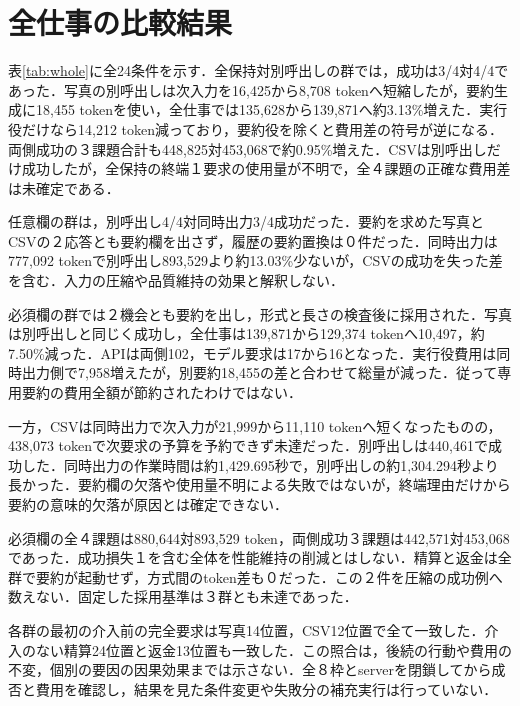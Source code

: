 \section{全仕事の比較結果}

表\ref{tab:whole}に全24条件を示す．全保持対別呼出しの群では，成功は3/4対4/4であった．写真の別呼出しは次入力を16,425から8,708 tokenへ短縮したが，要約生成に18,455 tokenを使い，全仕事では135,628から139,871へ約3.13\%増えた．実行役だけなら14,212 token減っており，要約役を除くと費用差の符号が逆になる．両側成功の３課題合計も448,825対453,068で約0.95\%増えた．CSVは別呼出しだけ成功したが，全保持の終端１要求の使用量が不明で，全４課題の正確な費用差は未確定である．

任意欄の群は，別呼出し4/4対同時出力3/4成功だった．要約を求めた写真とCSVの２応答とも要約欄を出さず，履歴の要約置換は０件だった．同時出力は777,092 tokenで別呼出し893,529より約13.03\%少ないが，CSVの成功を失った差を含む．入力の圧縮や品質維持の効果と解釈しない．

必須欄の群では２機会とも要約を出し，形式と長さの検査後に採用された．写真は別呼出しと同じく成功し，全仕事は139,871から129,374 tokenへ10,497，約7.50\%減った．APIは両側102，モデル要求は17から16となった．実行役費用は同時出力側で7,958増えたが，別要約18,455の差と合わせて総量が減った．従って専用要約の費用全額が節約されたわけではない．

一方，CSVは同時出力で次入力が21,999から11,110 tokenへ短くなったものの，438,073 tokenで次要求の予算を予約できず未達だった．別呼出しは440,461で成功した．同時出力の作業時間は約1,429.695秒で，別呼出しの約1,304.294秒より長かった．要約欄の欠落や使用量不明による失敗ではないが，終端理由だけから要約の意味的欠落が原因とは確定できない．

必須欄の全４課題は880,644対893,529 token，両側成功３課題は442,571対453,068であった．成功損失１を含む全体を性能維持の削減とはしない．精算と返金は全群で要約が起動せず，方式間のtoken差も０だった．この２件を圧縮の成功例へ数えない．固定した採用基準は３群とも未達であった．

各群の最初の介入前の完全要求は写真14位置，CSV12位置で全て一致した．介入のない精算24位置と返金13位置も一致した．この照合は，後続の行動や費用の不変，個別の要因の因果効果までは示さない．全８枠とserverを閉鎖してから成否と費用を確認し，結果を見た条件変更や失敗分の補充実行は行っていない．

